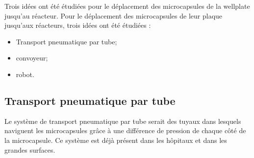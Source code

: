 Trois idées ont été étudiées pour le déplacement des \glspl{microcapsule} de la \gls{wellplate} jusqu'au réacteur. 
Pour le déplacement des \glspl{microcapsule} de leur plaque jusqu'aux réacteurs, trois idées ont été étudiées : 
\begin{itemize}
    \item Transport pneumatique par tube;
    \item convoyeur;
    \item robot.
\end{itemize}
\subsection*{Transport pneumatique par tube}
Le système de transport pneumatique par tube serait des tuyaux dans lesquels naviguent les \glspl{microcapsule} grâce à une différence de pression de chaque côté de la \gls{microcapsule}. Ce système est déjà présent dans les hôpitaux et dans les grandes surfaces.
